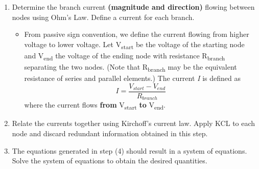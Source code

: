 \documentclass[12pt,letterpaper]{article}
\begin{document}
\begin{enumerate}
\item Determine the branch current \textbf{(magnitude and direction)} flowing between nodes using Ohm's Law. Define a current for each branch.
	\begin{itemize}
	\item From passive sign convention, we define the current flowing from higher voltage to lower voltage. Let  V\textsubscript{start} be the voltage of the starting node and V\textsubscript{end} the voltage of the ending node with resistance R\textsubscript{branch} separating the two nodes. (Note that R\textsubscript{branch} may be the equivalent resistance of series and parallel elements.) The current \textit{I} is defined as
\begin{equation} I = \frac{V_{start} - V_{end}}{R_{branch}} \end{equation}
where the current flows \textbf{from} V\textsubscript{start} \textbf{to} V\textsubscript{end}.
	\end{itemize}
	

\item Relate the currents together using Kirchoff's current law. Apply KCL to each node and discard redundant information obtained in this step.


\item The equations generated in step (4) should result in a system of equations. Solve the system of equations to obtain the desired quantities.

\end{enumerate}
	
\end{document}
